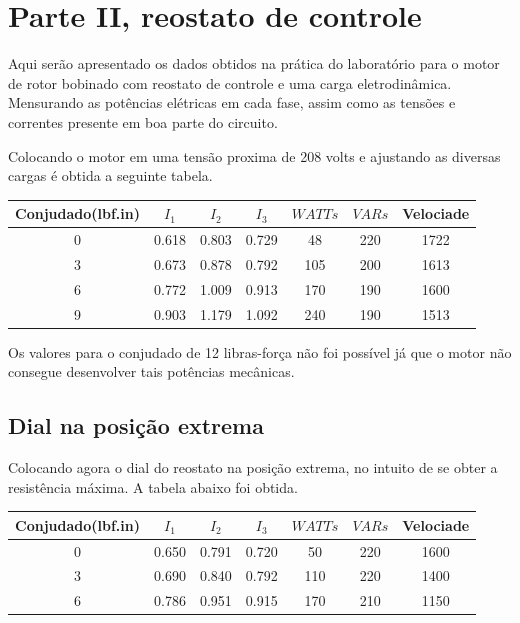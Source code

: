 \documentclass[paper=a4, fontsize=11pt]{article}
\begin{document}
\section{Parte II, reostato de controle}

Aqui serão apresentado os dados obtidos na prática
do laboratório para o motor de rotor bobinado com
reostato de controle e uma carga eletrodinâmica.
Mensurando as potências elétricas em cada fase, 
assim como as tensões e correntes presente em
boa parte do circuito. 

Colocando o motor em uma tensão proxima de 208 volts
e ajustando as diversas cargas é obtida a seguinte 
tabela. 

\begin{center}
    \begin{tabular}{c|c|c|c|c|c|c}
            Conjudado(lbf.in) & $I_1$ & $I_2$ & $I_3$ & $WATTs$ & $VARs$ & Velociade \\
            \hline
            0 & 0.618 & 0.803 & 0.729 & 48 & 220 & 1722 \\
            3 & 0.673 & 0.878 & 0.792 & 105 & 200 & 1613 \\
            6 & 0.772 & 1.009 & 0.913 & 170 & 190 & 1600 \\
            9 & 0.903 & 1.179 & 1.092 & 240 & 190 & 1513 \\
    \end{tabular}
\end{center}

Os valores para o conjudado de 12 libras-força não foi possível
já que o motor não consegue desenvolver tais potências mecânicas.

\subsection{Dial na posição extrema}

Colocando agora o dial do reostato na posição extrema, no intuito
de se obter a resistência máxima. A tabela abaixo foi obtida.

\begin{center}
    \begin{tabular}{c|c|c|c|c|c|c}
            Conjudado(lbf.in) & $I_1$ & $I_2$ & $I_3$ & $WATTs$ & $VARs$ & Velociade \\
            \hline
            0 & 0.650 & 0.791 & 0.720 & 50 & 220 & 1600 \\
            3 & 0.690 & 0.840 & 0.792 & 110 & 220 & 1400 \\
            6 & 0.786 & 0.951 & 0.915 & 170 & 210 & 1150 \\
    \end{tabular}
\end{center}
\end{document}

